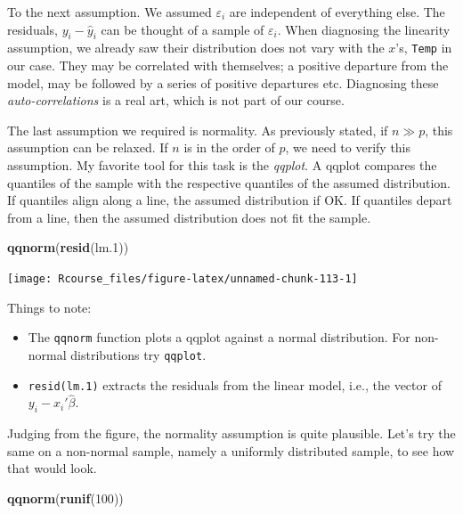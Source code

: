 \documentclass[]{book}
\newenvironment{Shaded}{\begin{snugshade}}{\end{snugshade}}
\newcommand{\KeywordTok}[1]{\textcolor[rgb]{0.13,0.29,0.53}{\textbf{#1}}}
\newcommand{\DecValTok}[1]{\textcolor[rgb]{0.00,0.00,0.81}{#1}}
\newcommand{\NormalTok}[1]{#1}
\providecommand{\tightlist}{%
  \setlength{\itemsep}{0pt}\setlength{\parskip}{0pt}}
\theoremstyle{definition}
\theoremstyle{definition}
\theoremstyle{definition}
\theoremstyle{remark}
\begin{document}
To the next assumption. We assumed \(\varepsilon_i\) are independent of
everything else. The residuals, \(y_i-\hat y_i\) can be thought of a
sample of \(\varepsilon_i\). When diagnosing the linearity assumption,
we already saw their distribution does not vary with the \(x\)'s,
\texttt{Temp} in our case. They may be correlated with themselves; a
positive departure from the model, may be followed by a series of
positive departures etc. Diagnosing these \emph{auto-correlations} is a
real art, which is not part of our course.

The last assumption we required is normality. As previously stated, if
\(n \gg p\), this assumption can be relaxed. If \(n\) is in the order of
\(p\), we need to verify this assumption. My favorite tool for this task
is the \emph{qqplot}. A qqplot compares the quantiles of the sample with
the respective quantiles of the assumed distribution. If quantiles align
along a line, the assumed distribution if OK. If quantiles depart from a
line, then the assumed distribution does not fit the sample.

\begin{Shaded}
\begin{Highlighting}[]
\KeywordTok{qqnorm}\NormalTok{(}\KeywordTok{resid}\NormalTok{(lm.}\DecValTok{1}\NormalTok{))}
\end{Highlighting}
\end{Shaded}

\texttt{[image: Rcourse\_files/figure-latex/unnamed-chunk-113-1]}

Things to note:

\begin{itemize}
\tightlist
\item
  The \texttt{qqnorm} function plots a qqplot against a normal
  distribution. For non-normal distributions try \texttt{qqplot}.
\item
  \texttt{resid(lm.1)} extracts the residuals from the linear model,
  i.e., the vector of \(y_i-x_i'\hat \beta\).
\end{itemize}

Judging from the figure, the normality assumption is quite plausible.
Let's try the same on a non-normal sample, namely a uniformly
distributed sample, to see how that would look.

\begin{Shaded}
\begin{Highlighting}[]
\KeywordTok{qqnorm}\NormalTok{(}\KeywordTok{runif}\NormalTok{(}\DecValTok{100}\NormalTok{))}
\end{Highlighting}
\end{Shaded}
\end{document}
